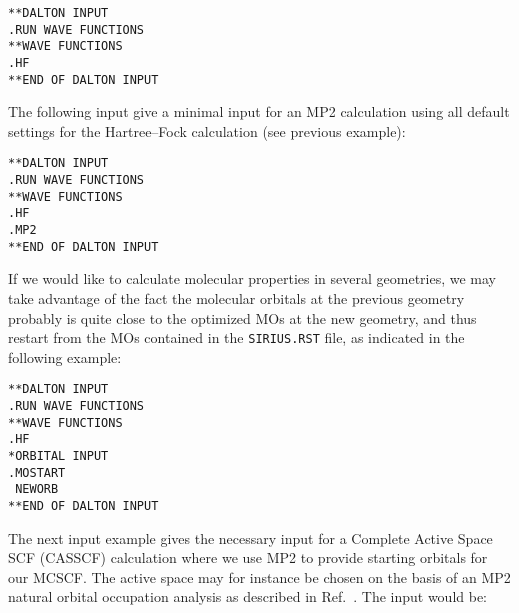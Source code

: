 \begin{verbatim}
**DALTON INPUT
.RUN WAVE FUNCTIONS
**WAVE FUNCTIONS
.HF
**END OF DALTON INPUT
\end{verbatim}
\label{sirius_ex1a}

The following input give a minimal input for an
MP2
calculation using all default settings for the Hartree--Fock
calculation (see previous example):

\begin{verbatim}
**DALTON INPUT
.RUN WAVE FUNCTIONS
**WAVE FUNCTIONS
.HF
.MP2
**END OF DALTON INPUT
\end{verbatim}
\label{sirius_ex1b}

If we would like to calculate molecular properties in several
geometries, we may take advantage of the fact the molecular
orbitals at the previous geometry probably is quite close to the
optimized MOs at the new geometry, and thus restart
from the MOs contained in the \verb|SIRIUS.RST|
file, as indicated in the following example:

\begin{verbatim}
**DALTON INPUT
.RUN WAVE FUNCTIONS
**WAVE FUNCTIONS
.HF
*ORBITAL INPUT
.MOSTART
 NEWORB
**END OF DALTON INPUT
\end{verbatim}
\label{sirius_ex2}

\begin{center}
\end{center}

The next input example gives the necessary input for a Complete
Active Space SCF (CASSCF) calculation where we use MP2 to provide
starting orbitals
for our MCSCF. The
active space may for instance be
chosen on the basis of an MP2 natural orbital occupation
analysis as
described in Ref.~\cite{hjajpjhajojcp88}. The input would be:

